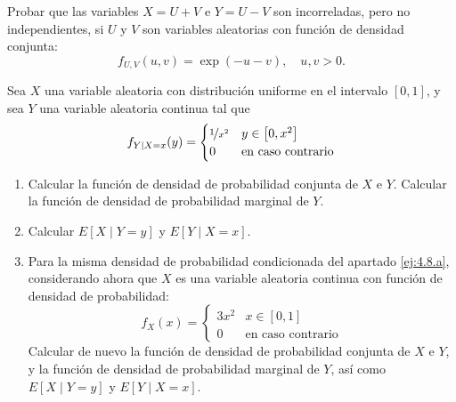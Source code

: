\begin{ejercicio} \label{ej:4.7}
    Probar que las variables $X = U + V$ e $Y = U - V$ son incorreladas, pero no independientes, si $U$ y $V$ son variables aleatorias con función de densidad conjunta:
    \begin{equation*}
        f_{U,V}(u, v) = \exp(-u-v), \quad u, v > 0.
    \end{equation*}
\end{ejercicio}

\begin{ejercicio}
    Sea $X$ una variable aleatoria con distribución uniforme en el intervalo $[0,1]$, y sea $Y$ una variable aleatoria continua tal que
    \begin{equation*}
        f_{Y\mid X=x}(y) = \begin{cases}
            \nicefrac{1}{x^2} & y \in \left[0, x^2\right]\\
            0 & \text{en caso contrario}
        \end{cases}
    \end{equation*}
    \begin{enumerate}
        \item\label{ej:4.8.a} Calcular la función de densidad de probabilidad conjunta de $X$ e $Y$. Calcular la función de densidad de probabilidad marginal de $Y$.
        \item Calcular $E[X\mid Y = y]$ y $E[Y\mid X = x]$.
        \item Para la misma densidad de probabilidad condicionada del apartado \ref{ej:4.8.a}, considerando ahora que $X$ es una variable aleatoria continua con función de densidad de probabilidad:
        \begin{equation*}
            f_X(x) = \begin{cases}
                3x^2 & x \in \left[0,1\right]\\
                0 & \text{en caso contrario}
            \end{cases}
        \end{equation*}
        Calcular de nuevo la función de densidad de probabilidad conjunta de $X$ e $Y$, y la función de densidad de probabilidad marginal de $Y$, así como $E[X\mid Y = y]$ y $E[Y\mid X = x]$.
    \end{enumerate}
\end{ejercicio}

